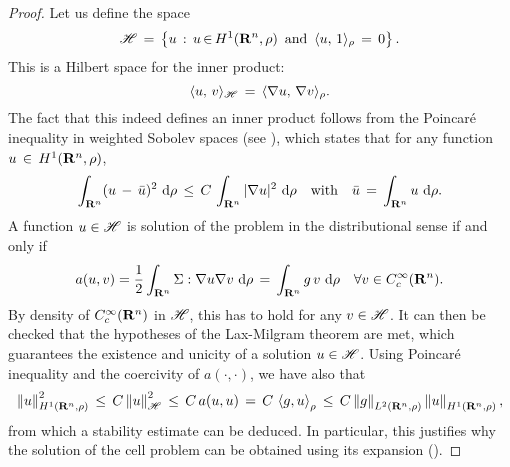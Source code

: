 \iflong \begin{proof}
    Let us define the space 
    $$
        \mathscr H \,=\,\left\{u\,:\, u\,{\in}\,H^1(\mathbf R^n,\rho)\,\text{ and }\,\langle
            u,\,1\rangle_{\rho}\,=\, 0\right\}. 
    $$
    This is a Hilbert space for the inner product:
    $$
        \langle u,\,v\rangle_{\mathscr H} \,=\, \langle {\nabla}u,\, {\nabla}v\rangle_{\rho}.  
    $$
    The fact that this indeed defines an inner product follows from the
    Poincar\'e inequality in weighted Sobolev spaces (see
    \citep{arnold2007interpolation,beckner1989generalized}), which states that
    for any function $u\,\in\,H^{1}(\mathbf R^n, \rho)$,
    $$
        \int_{\mathbf R^n} (u\,-\,\bar u)^2 \, \,\mathrm d \rho\, \leq \,C\,\int_{\mathbf R^n} |\nabla
        u|^2 \,\,\mathrm d \rho \quad \text{with}\quad \bar u \,=\, \int_{\mathbf R^n} u\,\,\mathrm d \rho.
    $$
    A function $u\in \mathscr H$ is solution of the problem in the
    distributional sense if and only if
    $$
        a(u,v) = \frac{1}{2} \int_{\mathbf R^n}  \Sigma : \nabla u \nabla v \,
        \,\mathrm d \rho \,=\, \int_{\mathbf R^n} g \,v\,\,\mathrm d \rho \quad \forall v \in C^\infty_c(\mathbf R^n).
    $$
    By density of $C^\infty_c(\mathbf R^n)$ in $\mathscr H$, this has to hold for any $v \in
    \mathscr H$. It can then be checked that the hypotheses of the Lax-Milgram
    theorem are met, which guarantees the existence and unicity of a solution 
    $u \in \mathscr H$. Using Poincar\'e inequality and the coercivity of
    $a(\cdot,\cdot)$, we have also that
    $$
        \left\| u \right\|_{H^{1}(\mathbf R^n, \rho)}^2 \,\leq\, C  \left\| u \right\|_{\mathscr
            H}^2 \,\leq\, C\,a(u,u) \,=\, C\, \left \langle g,u \right\rangle_{\rho} \,\leq\, C
        \left\| g \right\|_{L^{2}(\mathbf R^n,\rho)}
        \left\| u \right\|_{H^{1}(\mathbf R^n, \rho)}, 
    $$
    from which a stability estimate can be deduced. In particular, this
    justifies why the solution of the cell problem can be obtained using its
    expansion ().


\end{proof}
